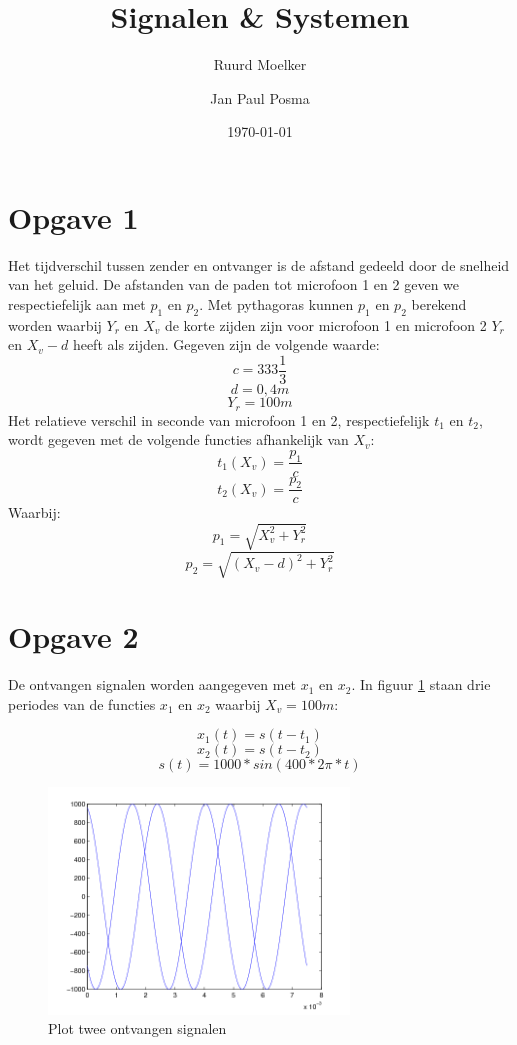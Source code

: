 \documentclass{article}
\author{Ruurd Moelker \and Jan Paul Posma}
\date{\today}
\title{Signalen \& Systemen}
\begin{document}
\maketitle 

\section{Opgave 1}
Het tijdverschil tussen zender en ontvanger is de afstand gedeeld door de
snelheid van het geluid. De afstanden van de paden tot microfoon 1 en 2 geven
we respectiefelijk aan met $p_{1}$ en $p_{2}$. Met pythagoras kunnen $p_{1}$ en
$p_{2}$ berekend worden waarbij $Y_r$ en $X_v$ de korte zijden zijn voor
microfoon 1 en microfoon 2 $Y_{r}$ en $X_{v}-d$ heeft als zijden. Gegeven zijn de volgende
waarde: $$c = 333\frac{1}{3}$$ $$d = 0,4m$$ $$Y_{r} = 100m$$ Het relatieve
verschil in seconde van microfoon 1 en 2, respectiefelijk $t_1$ en $t_2$, wordt
gegeven met de volgende functies afhankelijk van $X_v$: $$t_{1}(X_{v}) =
\frac{p_{1}}{c}$$ $$t_{2}(X_{v}) = \frac{p_{2}}{c}$$ Waarbij: $$p_{1} =
\sqrt{X_{v}^{2} + Y_{r}^{2}}$$ $$p_{2} = \sqrt{(X_{v}-d)^{2} + Y_{r}^{2}}$$

\newpage
\section{Opgave 2}
De ontvangen signalen worden aangegeven met $x_{1}$ en $x_{2}$. In figuur
\ref{2a} staan drie periodes van de functies $x_{1}$ en $x_{2}$ waarbij $X_{v}
= 100m$:

$$x_{1}(t) = s(t - t_1)$$ $$x_{2}(t) = s(t - t_{2})$$ $$s(t) =
1000*sin(400*2\pi*t)$$


\begin{figure}[h]
	\center
	\begin{center}
	\includegraphics[width = 8cm]{2a.png}
	\caption{Plot twee ontvangen signalen}
	\end{center}
 \label{2a}
\end{figure}
\end{document}
